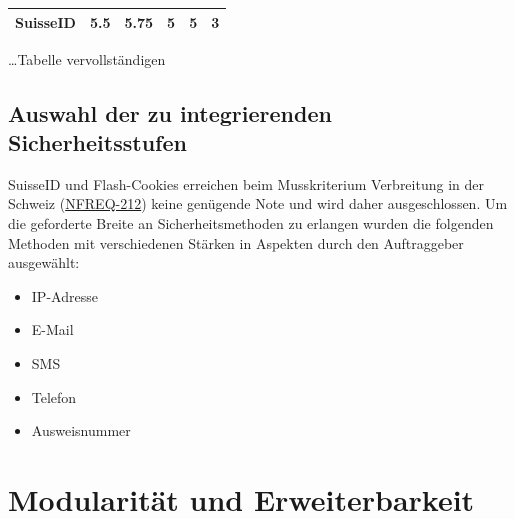 \begin{longtable}[c]{@{}lllllc@{}}
\begin{minipage}[t]{0.19\columnwidth}
\textbf{SuisseID}
\strut\end{minipage} &
\begin{minipage}[t]{0.13\columnwidth}\raggedright\strut
5.5
\strut\end{minipage} &
\begin{minipage}[t]{0.13\columnwidth}\raggedright\strut
5.75
\strut\end{minipage} &
\begin{minipage}[t]{0.11\columnwidth}\raggedright\strut
5
\strut\end{minipage} &
\begin{minipage}[t]{0.13\columnwidth}\raggedright\strut
5
\strut\end{minipage} &
\begin{minipage}[t]{0.13\columnwidth}\centering\strut
3
\strut\end{minipage}\tabularnewline
\bottomrule
\end{longtable}

\ldots{}Tabelle vervollständigen

\subsection{Auswahl der zu integrierenden
Sicherheitsstufen}\label{auswahl-der-zu-integrierenden-sicherheitsstufen}

SuisseID und Flash-Cookies erreichen beim Musskriterium Verbreitung in
der Schweiz (\href{FREQ-212}{NFREQ-212}) keine genügende Note und wird
daher ausgeschlossen. Um die geforderte Breite an Sicherheitsmethoden zu
erlangen wurden die folgenden Methoden mit verschiedenen Stärken in
Aspekten durch den Auftraggeber ausgewählt:

\begin{itemize}
\tightlist
\item
  IP-Adresse
\item
  E-Mail
\item
  SMS
\item
  Telefon
\item
  Ausweisnummer
\end{itemize}

\newpage

\hypertarget{modularituxe4t-und-erweiterbarkeit}{\section{Modularität
und Erweiterbarkeit}\label{modularituxe4t-und-erweiterbarkeit}}

